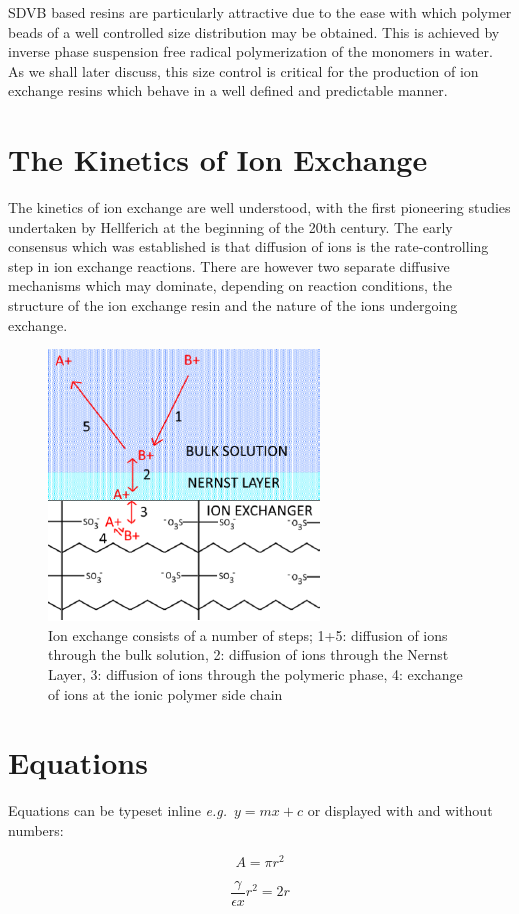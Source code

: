 \documentclass[twoside,twocolumn,9pt]{article}
\begin{document}
SDVB based resins are particularly attractive due to the ease with which polymer beads of a well controlled size distribution may be obtained. This is achieved by inverse phase suspension free radical polymerization of the monomers in water.  As we shall later discuss, this size control is critical for the production of ion exchange resins which behave in a well defined and predictable manner.

\section{The Kinetics of Ion Exchange}
The kinetics of ion exchange are well understood, with the first pioneering studies undertaken by Hellferich at the beginning of the 20th century.\cite{helfferich1962} The early consensus which was established is that diffusion of ions is the rate-controlling step in ion exchange reactions. There are however two separate diffusive mechanisms which may dominate, depending on reaction conditions, the structure of the ion exchange resin and the nature of the ions undergoing exchange.

\begin{figure}[h !]
	\centering\includegraphics[height=.3\textwidth]{images/types_of_diffusion}
	\caption{Ion exchange consists of a number of steps; 1+5: diffusion of ions through the bulk solution, 2: diffusion of ions through the Nernst Layer, 3: diffusion of ions through the polymeric phase, 4: exchange of ions at the ionic polymer side chain}
\end{figure}
\section{Equations}

Equations can be typeset inline \textit{e.g.}\ $ y = mx + c$ or displayed with and without numbers:

 \[ A = \pi r^2 \]

\begin{equation}
  \frac{\gamma}{\epsilon x} r^2 = 2r
\end{equation}
\end{document}

